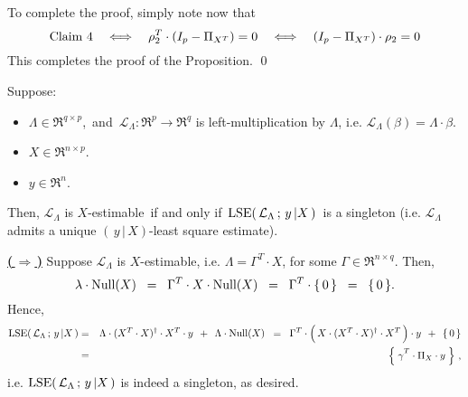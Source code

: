 \vskip 0.5cm
\noindent
To complete the proof, simply note now that
\begin{equation*}
\textnormal{Claim 4}
\quad\Longleftrightarrow\quad
	\rho_{2}^{T} \cdot (I_{p} - \Pi_{X^{T}}) = 0
\quad\Longleftrightarrow\quad
	(I_{p} - \Pi_{X^{T}}) \cdot \rho_{2} = 0
\end{equation*}
This completes the proof of the Proposition.
\qed

\begin{theorem}
\label{MatrixEstimabilityImpliesUniqueLSE}
\mbox{}\vskip 0.1cm\noindent
Suppose:
\begin{itemize}
\item
	$\Lambda \in \Re^{q \times p}$,\,
	and
	\,$\mathcal{L}_{\Lambda} : \Re^{p} \longrightarrow \Re^{q}$ is left-multiplication by $\Lambda$,
	i.e. $\mathcal{L}_{\Lambda}(\beta) = \Lambda \cdot \beta$.
\item
	$X \in \Re^{n \times p}$.
\item
	$y \in \Re^{n}$.
\end{itemize}
Then,
	$\mathcal{L}_{\Lambda}$ is $X$-estimable
	\,if and only if\,
	$\textnormal{LSE}\!\left(\,\mathcal{L}_{\Lambda} \,;\, y\,\vert X\,\right)$\,
	is a singleton (i.e. $\mathcal{L}_{\Lambda}$ admits a unique $(\,y\,\vert\,X)$-least square estimate).
\end{theorem}
\proof
\vskip 0.2cm\noindent
\underline{\textbf{(\,$\Longrightarrow$\,)}}\quad
Suppose $\mathcal{L}_{\Lambda}$ is $X$-estimable, i.e. $\Lambda = \Gamma^{T} \cdot X$,
for some $\Gamma \in \Re^{n \times q}$.
Then,
\begin{equation*}
\lambda\cdot\textnormal{Null}(X) \;\;=\;\; \Gamma^{T} \cdot X \cdot \textnormal{Null}(X) \;\;=\;\; \Gamma^{T} \cdot \{\,0\,\} \;\;=\;\; \{\,0\,\}.
\end{equation*}
Hence,
\begin{eqnarray*}
\lse\!\left(\,\mathcal{L}_{\Lambda} \,;\, y\,\vert X\,\right)
&=&
	\Lambda \cdot (X^{T} \cdot X)^{\dagger} \cdot X^{T} \cdot y \;\, + \;\, \Lambda \cdot \Null(X)
\;\;=\;\;
	\Gamma^{T} \cdot \left(\,\overset{{\color{white}.}}{X} \cdot (X^{T} \cdot X)^{\dagger} \cdot X^{T}\,\right) \cdot y \;\, + \;\, \{\,0\,\}
\\
&=&
	\left\{\; \overset{{\color{white}.}}{\gamma}^{T} \cdot \Pi_{X} \cdot y \;\right\}\,,
\end{eqnarray*}
i.e. $\textnormal{LSE}\!\left(\,\mathcal{L}_{\Lambda} \,;\, y\,\vert X\,\right)$ is indeed a singleton, as desired.

